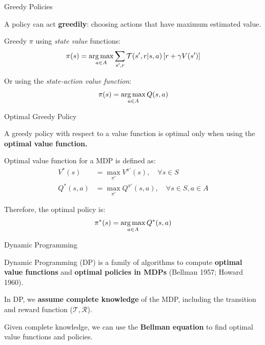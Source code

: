 \begin{frame}{Greedy Policies}

    A policy can act \textbf{greedily}: choosing actions that have maximum estimated value.
    \vspace{10pt}
    
    Greedy $\pi$ using \textit{state value} functions:
    \vspace{5pt}    
    \begin{align*}
       \pi(s) = \operatorname*{arg\,max}_{a \in A} \sum_{s', r} \mathcal{T}(s', r | s, a) \left[ r + \gamma V(s') \right]
    \end{align*}
    
    Or using the \textit{state-action value function}:
    \vspace{5pt}
    \begin{align*}
        \pi(s) = \operatorname*{arg\,max}_{a \in A}Q(s, a)    
    \end{align*}
    
\end{frame}

\begin{frame}[t]{Optimal Greedy Policy}

   A greedy policy with respect to a value function is optimal only when using the \textbf{optimal value function.} 
    
    Optimal value function for a MDP is defined as:
    \vspace{5pt}
    \begin{align*}
        V^{*}(s) &= \max_{\pi'} V^{\pi'}(s), \quad \forall s \in S \\
        Q^{*}(s, a) &= \max_{\pi'} Q^{\pi'}(s, a), \quad \forall s \in S, a \in A
    \end{align*}

    Therefore, the optimal policy is:
    \vspace{5pt}
    \begin{align*}
        \pi^{*}(s) = \operatorname*{arg\,max}_{a \in A}Q^{*}(s, a)    
    \end{align*}
\end{frame}

\begin{frame}{Dynamic Programming}
    \blist
    	\itemsep=10pt
        \item Dynamic Programming (DP) is a family of algorithms to compute \textbf{optimal value functions} and \textbf{optimal policies in MDPs} (Bellman 1957; Howard 1960).
        \item In DP, we \textbf{assume complete knowledge} of the MDP, including the transition and reward function ($\mathcal{T}, \mathcal{R}$).
        \item Given complete knowledge, we can use the \textbf{Bellman equation} to find optimal value functions and policies.
    \elist   
\end{frame}

